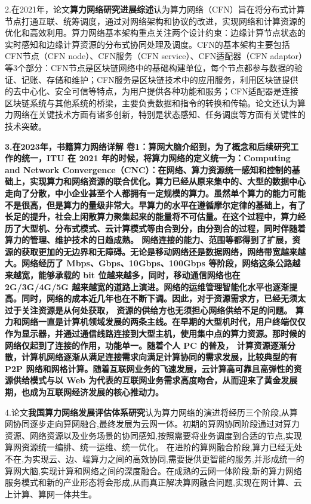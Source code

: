 \documentclass[a4paper,twoside]{scrbook}
\begin{document}
2.在2021年，论文\textbf{算力网络研究进展综述}认为算力网络（CFN）旨在将分布式计算节点打通互联、统筹调度，通过对网络架构和协议的改进，实现网络和计算资源的优化和高效利用。算力网络基本架构重点关注两个设计约束：边缘计算节点状态的实时感知和边缘计算资源的分布式协同处理及调度。CFN的基本架构主要包括CFN节点（CFN node）、CFN服务（CFN service）、CFN适配器（CFN adaptor）等3个部分：CFN节点是区块链网络中的基础构建单位，每个节点都参与数据的验证、记账、存储和维护；CFN服务是区块链技术中的应用服务，利用区块链提供的去中心化、安全可信等特点，为用户提供各种功能和服务；CFN适配器是连接区块链系统与其他系统的桥梁，主要负责数据和指令的转换和传输。论文还认为算力网络在关键技术方面有诸多创新，特别是状态感知、任务调度等方面有关键性的技术突破。

\textbf{3.在2023年，书籍\textbf{算力网络详解 卷1：算网大脑}介绍到，为了概念和后续研究工作的统一，ITU 在 2021 年的时候，将算力网络的定义统一为：Computing and Network Convergence（CNC）：在网络、算力资源统一感知和控制的基础上，实现算力和网络资源的联合优化。算力已经从原来集中的、大型的数据中心走向了分散，中小企业甚至个人都拥有一定规模的算力。虽然单个算力的能力可能不是很高，但是算力的量级非常大。早算力的水平在遵循摩尔定律的基础上，有了长足的提升，社会上闲散算力聚集起来的能量将不可估量。在这个过程中，算力经历了大型机、分布式模式、云计算模式等由合到分，由分到合的过程，同时伴随着算力的管理、维护技术的日趋成熟。
网络连接的能力、范围等都得到了扩展，资源的获取更加的无边界和无障碍。无论是移动网络还是数据网络，网络带宽越来越大。网络经历了 Mbps、Gbps、10Gbps、100Gbps 等阶段，网络这条公路越来越宽，能够承载的 bit 位越来越多，同时，移动通信网络也在 2G/3G/4G/5G 越来越宽的道路上演进。网络的运维管理智能化水平也逐渐提高。同时，网络的成本近几年也在不断下调。因此，对于资源需求方，已经无须太过于关注资源是从何处获取，
资源的供给方也无须担心网络供给不足的问题。
算力和网络一直是计算机领域发展的两条主线。在早期的大型机时代，用户终端仅仅作为显示器，并通过通信线路连接到大型主机，使用集中点的算力资源。那时候的网络仅起到了连接的作用，功能单一。随着个人 PC 的普及，
计算资源逐渐分散，计算机网络逐渐从满足连接需求向满足计算协同的需求发展，比较典型的有 P2P 网络和网格计算。随着互联网业务的飞速发展，云计算高可靠且高弹性的资源供给模式与以 Web 为代表的互联网业务需求高度吻合，从而迎来了黄金发展期，也成为互联网经济发展的核心推动力。}


4.论文\textbf{我国算力网络发展评估体系研究}认为算力网络的演进将经历三个阶段,从算网协同逐步走向算网融合,最终发展为云网一体。初期的算网协同阶段通过对算力资源、网络资源以及业务场景的协同感知,按照需要将业务调度到合适的节点,实现算网资源统一编排、统一运维、统一优化。 在进阶的算网融合阶段,算力已经无处不在,为实现云、边、端算力之间的高效协同,需要提供更智能的服务,并形成统一的算网大脑,实现计算和网络之间的深度融合。在成熟的云网一体阶段,新的算力网络服务模式和新的产业形态将会形成,从而真正解决算网融合问题,实现在网计算、云上计算、算网一体共生。
\end{document}
